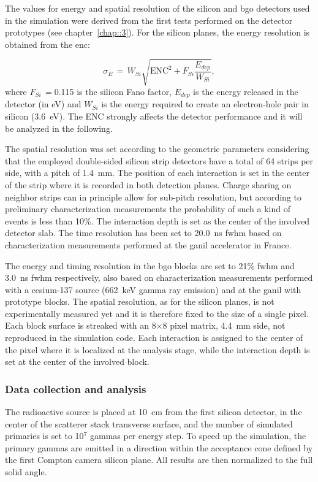 The values for energy and spatial resolution of the silicon and \gls{bgo} detectors used in the simulation were derived from the first tests performed on the detector prototypes (see chapter~\ref{chap::3}). For the silicon planes, the energy resolution is obtained from the \gls{enc}:

\begin{equation}
\sigma_{E}\, = \,W_{Si} \sqrt{\mathrm{ENC}^{2} + F_{Si}\frac{E_{dep}}{W_{Si}}},
\label{chap5::eq::E_res_ENC}
\end{equation}
where $F_{Si}\,=$0.115 is the silicon Fano factor, $E_{dep}$ is the energy released in the detector (in eV) and $W_{Si}$ is the energy required to create an electron-hole pair in silicon (3.6~eV). The ENC strongly affects the detector performance and it will be analyzed in the following. 

The spatial resolution was set according to the geometric parameters considering that the employed double-sided silicon strip detectors have a total of 64 strips per side, with a pitch of 1.4~mm. The position of each interaction is set in the center of the strip where it is recorded in both detection planes. Charge sharing on neighbor strips can in principle allow for sub-pitch resolution, but according to preliminary characterization measurements the probability of such a kind of events is less than 10\%. The interaction depth is set as the center of the involved detector slab. The time resolution has been set to 20.0~ns \gls{fwhm} based on characterization measurements performed at the \gls{ganil} accelerator in France.

The energy and timing resolution in the \gls{bgo} blocks are set to 21\% \gls{fwhm} and 3.0~ns \gls{fwhm} respectively, also based on characterization measurements performed with a cesium-137 source (662~keV gamma ray emission) and at the \gls{ganil} with prototype blocks. The spatial resolution, as for the silicon planes, is not experimentally measured yet and it is therefore fixed to the size of a single pixel. Each block surface is streaked with an 8$\times$8 pixel matrix, 4.4~mm side, not reproduced in the simulation code. Each interaction is assigned to the center of the pixel where it is localized at the analysis stage, while the interaction depth is set at the center of the involved block.

\subsubsection{Data collection and analysis}\label{chap5::subsubsec::CC_analysis}
The radioactive source is placed at 10~cm from the first silicon detector, in the center of the scatterer stack transverse surface, and the number of simulated primaries is set to 10$^{7}$ gammas per energy step. To speed up the simulation, the primary gammas are emitted in a direction within the acceptance cone defined by the first Compton camera silicon plane. All results are then normalized to the full solid angle. 


